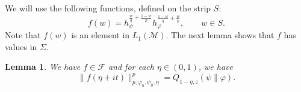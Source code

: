 \documentclass[12pt]{article}
\newtheorem{lemma}{Lemma}
\theoremstyle{definition}
\theoremstyle{remark}
\newtheorem{remark}{Remark}
\def\Me{\mathcal M}
\def\Fe{\mathcal F}
\begin{document}
%
%
%
We will use the following functions, defined on the strip $S$:
\begin{equation}\label{eq:f}
f(w)= h_\psi^{\frac wq+\frac{1-w}p}h_\varphi^{\frac{1-w}q+\frac wp},\qquad w\in S.
\end{equation}
Note that $f(w)$ is an element in $L_1(\Me)$. The next lemma shows that $f$ has values in
$\Sigma$.

\begin{lemma}\label{lemma:fw}  We have $f\in \Fe$ and  
for each $\eta\in (0,1)$, we have
\[
\|f(\eta+it)\|_{p,\varphi_0,\psi_0,\eta}^p=Q_{1-\eta,z}(\psi\|\varphi).
\]



\end{lemma}
\end{document}
